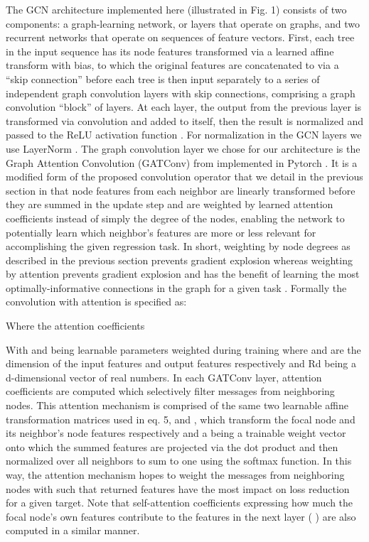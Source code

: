 The GCN architecture implemented here (illustrated in Fig. 1) consists of two components: a graph-learning network, or layers that operate on graphs, and two recurrent networks that operate on sequences of feature vectors. First, each tree in the input sequence has its node features transformed via a learned affine transform with bias, to which the original features are concatenated to via a “skip connection” before each tree is then input separately to a series of independent graph convolution layers with skip connections, comprising a graph convolution “block” of layers. At each layer, the output from the previous layer is transformed via convolution and added to itself, then the result is normalized and passed to the ReLU activation function \cite{agarapDeepLearningUsing2018}. For normalization in the GCN layers we use LayerNorm \cite{baLayerNormalization2016}. The graph convolution layer we chose for our architecture is the Graph Attention Convolution (GATConv) from \cite{brodyHowAttentiveAre2022} implemented in Pytorch \cite{paszkePyTorchImperativeStyle2019}. It is a modified form of the proposed convolution operator that we detail in the previous section in that node features from each neighbor are linearly transformed before they are summed in the update step and are weighted by learned attention coefficients instead of simply the degree of the nodes, enabling the network to potentially learn which neighbor’s features are more or less relevant for accomplishing the given regression task. In short, weighting by node degrees as described in the previous section prevents gradient explosion whereas weighting by attention prevents gradient explosion and has the benefit of learning the most optimally-informative connections in the graph for a given task \cite{brodyHowAttentiveAre2022}. Formally the convolution with attention is specified as:
 
Where the attention coefficients  %

 
With  %
  and  %
   being learnable parameters weighted during training where   %
 and  %
  are the dimension of the input features and output features respectively and Rd being a d-dimensional vector of real numbers. In each GATConv layer, attention coefficients   are computed which selectively filter messages from neighboring nodes.  This attention mechanism is comprised of the same two learnable affine transformation matrices used in eq. 5,   and  , which transform the focal node and its neighbor’s node features respectively and a being a trainable weight vector onto which the summed features are projected via the dot product and then normalized over all neighbors to sum to one using the softmax function. In this way, the attention mechanism hopes to weight the messages from neighboring nodes with   such that returned features have the most impact on loss reduction for a given target.  Note that self-attention coefficients expressing how much the focal node’s own features contribute to  the features in the next layer ( ) are also computed in a similar manner.

